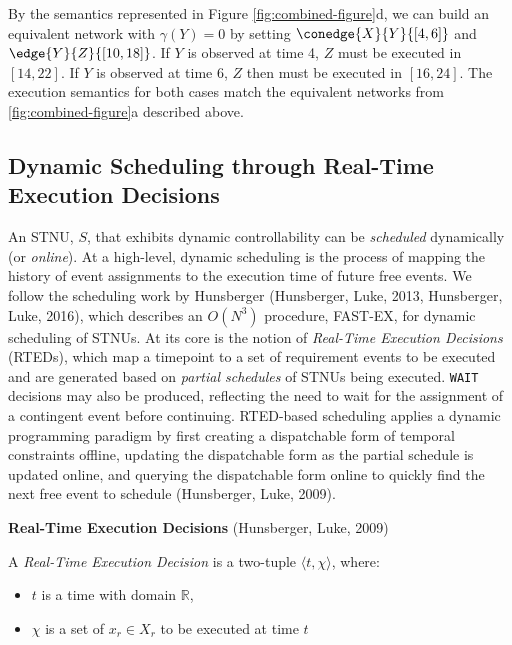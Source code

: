 \documentclass[11pt]{article}
\begin{document}
By the semantics represented in Figure \ref{fig:combined-figure}d, we can build an equivalent
network with \(\gamma(Y) = 0\) by setting \(\conedge{X}{Y}{[4, 6]}\) and \(\edge{Y}{Z}{[10, 18]}\). If \(Y\)
is observed at time 4, \(Z\) must be executed in \([14, 22]\). If \(Y\) is observed at time 6, \(Z\) then
must be executed in \([16, 24]\). The execution semantics for both cases match the equivalent networks
from \ref{fig:combined-figure}a described above.

\subsection{Dynamic Scheduling through Real-Time Execution Decisions}
\label{sec:orgd757cee}
\label{sec:dynamic-scheduling}

An STNU, \(S\), that exhibits dynamic controllability can be \emph{scheduled} dynamically (or \emph{online}). At
a high-level, dynamic scheduling is the process of mapping the history of event assignments to the
execution time of future free events. We follow the scheduling work by Hunsberger
(Hunsberger, Luke, 2013, Hunsberger, Luke, 2016), which describes an \(O(N^{3})\) procedure, FAST-EX, for
dynamic scheduling of STNUs. At its core is the notion of \emph{Real-Time Execution Decisions} (RTEDs),
which map a timepoint to a set of requirement events to be executed and are generated based on
\emph{partial schedules} of STNUs being executed. \texttt{WAIT} decisions may also be produced, reflecting the
need to wait for the assignment of a contingent event before continuing. RTED-based scheduling
applies a dynamic programming paradigm by first creating a dispatchable form of temporal constraints
offline, updating the dispatchable form as the partial schedule is updated online, and querying the
dispatchable form online to quickly find the next free event to schedule (Hunsberger, Luke, 2009).

\begin{defn}
\textbf{Real-Time Execution Decisions} (Hunsberger, Luke, 2009)

A \emph{Real-Time Execution Decision} is a two-tuple \(\langle t, \chi \rangle\), where:
\begin{itemize}
\item \(t\) is a time with domain \(\mathbb{R}\),
\item \(\chi\) is a set of \(x_{r} \in X_{r}\) to be executed at time \(t\)
\end{itemize}
\end{defn}
\end{document}
